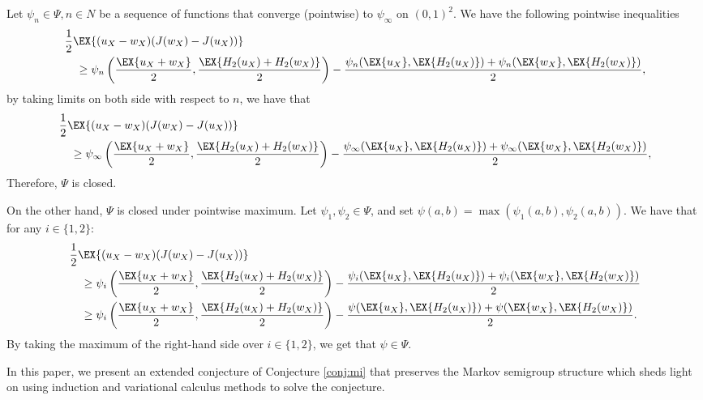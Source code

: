\documentclass[conference,letterpaper,onecolumn]{IEEEtran}
\theoremstyle{plain}%
\begin{document}
 Let $\psi_n \in \Psi,n\in N$ be a sequence of functions that converge (pointwise) to $\psi_\infty$ on $(0,1)^2$. We have the following pointwise inequalities
    {\begin{align*}
        &\frac{1}{2}\EX{(u_X-w_X)(J(w_X) - J(u_X))}\\
        &\quad\geq \psi_n\left(\frac{\EX{u_X+w_X}}{2},\frac{\EX{H_2(u_X) + H_2(w_X)}}{2}\right) - \frac{\psi_n(\EX{u_X},\EX{H_2(u_X)}) + \psi_n(\EX{w_X},\EX{H_2(w_X)})}{2},
    \end{align*}}
    by taking limits on both side with respect to $n$, we have that
    {\begin{align*}
        &\frac{1}{2}\EX{(u_X-w_X)(J(w_X) - J(u_X))}\\
        &\quad\geq \psi_\infty\left(\frac{\EX{u_X+w_X}}{2},\frac{\EX{H_2(u_X) + H_2(w_X)}}{2}\right) - \frac{\psi_\infty(\EX{u_X},\EX{H_2(u_X)}) + \psi_\infty(\EX{w_X},\EX{H_2(w_X)})}{2},
    \end{align*}}
    Therefore, $\Psi$ is closed.

    On the other hand, $\Psi$ is closed under pointwise maximum. Let $\psi_1,\psi_2\in \Psi$, and set
$\psi(a,b)=\max(\psi_1(a,b),\psi_2(a,b))$. We have that for any $i\in\{1,2\}$:
    {\begin{align*}
        &\frac{1}{2}\EX{(u_X-w_X)(J(w_X) - J(u_X))} \\
        &\quad\geq \psi_i\left(\frac{\EX{u_X+w_X}}{2},\frac{\EX{H_2(u_X) + H_2(w_X)}}{2}\right) - \frac{\psi_i(\EX{u_X},\EX{H_2(u_X)}) + \psi_i(\EX{w_X},\EX{H_2(w_X)})}{2}\\
        &\quad\geq \psi_i\left(\frac{\EX{u_X+w_X}}{2},\frac{\EX{H_2(u_X) + H_2(w_X)}}{2}\right) - \frac{\psi (\EX{u_X},\EX{H_2(u_X)}) + \psi (\EX{w_X},\EX{H_2(w_X)})}{2}.
    \end{align*}}
    By taking the maximum of the right-hand side over $i\in\{1,2\}$, we get that $\psi\in\Psi$. %


\iffalse

In this paper, we present an extended conjecture of Conjecture \ref{conj:mi} that preserves the Markov semigroup structure which sheds light on using induction and variational calculus methods to solve the conjecture.
\end{document}
